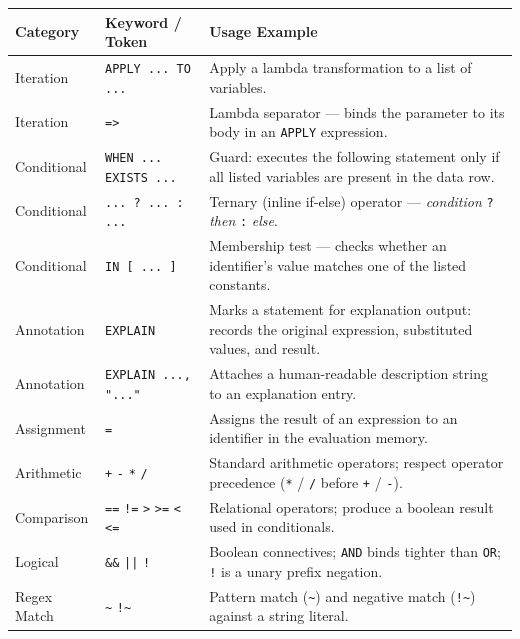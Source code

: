 \begin{table}[htbp]
\centering
\begin{tabular}{|>{\arraybackslash}m{}|>{\arraybackslash}m{}|>{\arraybackslash}m{}|}
\hline
\textbf{Category} & \textbf{Keyword / Token} & \textbf{Usage Example} \\
\hline
\hline Iteration & \texttt{APPLY ... TO ...} & Apply a lambda transformation to a list of variables. \\
\hline Iteration & \texttt{=>} & Lambda separator — binds the parameter to its body in an \texttt{APPLY} expression. \\
\hline Conditional & \texttt{WHEN ... EXISTS ...} & Guard: executes the following statement only if all listed variables are present in the data row. \\
\hline Conditional & \texttt{... ? ... : ...} & Ternary (inline if-else) operator — \textit{condition} \texttt{?} \textit{then} \texttt{:} \textit{else}. \\
\hline Conditional & \texttt{IN [~...~]} & Membership test — checks whether an identifier's value matches one of the listed constants. \\
\hline Annotation & \texttt{EXPLAIN} & Marks a statement for explanation output: records the original expression, substituted values, and result. \\
\hline Annotation & \texttt{EXPLAIN ..., "..."}  & Attaches a human-readable description string to an explanation entry. \\
\hline Assignment & \texttt{=} & Assigns the result of an expression to an identifier in the evaluation memory. \\
\hline Arithmetic & \texttt{+} \texttt{-} \texttt{*} \texttt{/} & Standard arithmetic operators; respect operator precedence (\texttt{*} / \texttt{/} before \texttt{+} / \texttt{-}). \\
\hline Comparison & \texttt{==} \texttt{!=} \texttt{>} \texttt{>=} \texttt{<} \texttt{<=} & Relational operators; produce a boolean result used in conditionals. \\
\hline Logical & \texttt{\&\&} \texttt{||} \texttt{!} & Boolean connectives; \texttt{AND} binds tighter than \texttt{OR}; \texttt{!} is a unary prefix negation. \\
\hline Regex Match & \texttt{\textasciitilde} \texttt{!\textasciitilde} & Pattern match (\texttt{\textasciitilde}) and negative match (\texttt{!\textasciitilde}) against a string literal. \\

\end{tabular}
\end{table}
